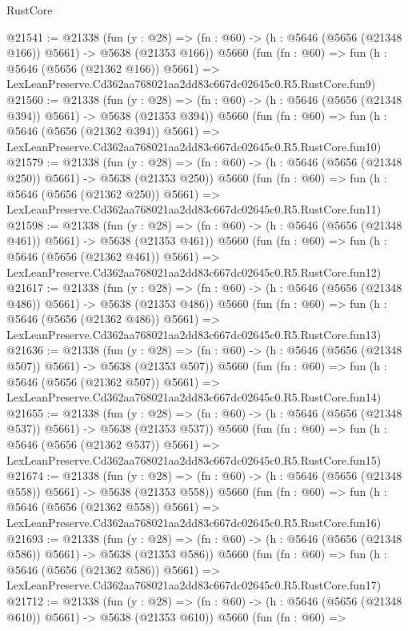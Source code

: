 \begin{lexlean}{RustCore}
\begin{coremodule}
@21541 := @21338
    (fun (y : @28) => (fn : @60) -> (h : @5646 (@5656 (@21348 @166)) @5661) -> @5638 (@21353 @166))
    @5660
    (fun (fn : @60) =>
    fun (h : @5646 (@5656 (@21362 @166)) @5661) =>
    LexLeanPreserve.Cd362aa768021aa2dd83c667dc02645c0.R5.RustCore.fun9)
@21560 := @21338
    (fun (y : @28) => (fn : @60) -> (h : @5646 (@5656 (@21348 @394)) @5661) -> @5638 (@21353 @394))
    @5660
    (fun (fn : @60) =>
    fun (h : @5646 (@5656 (@21362 @394)) @5661) =>
    LexLeanPreserve.Cd362aa768021aa2dd83c667dc02645c0.R5.RustCore.fun10)
@21579 := @21338
    (fun (y : @28) => (fn : @60) -> (h : @5646 (@5656 (@21348 @250)) @5661) -> @5638 (@21353 @250))
    @5660
    (fun (fn : @60) =>
    fun (h : @5646 (@5656 (@21362 @250)) @5661) =>
    LexLeanPreserve.Cd362aa768021aa2dd83c667dc02645c0.R5.RustCore.fun11)
@21598 := @21338
    (fun (y : @28) => (fn : @60) -> (h : @5646 (@5656 (@21348 @461)) @5661) -> @5638 (@21353 @461))
    @5660
    (fun (fn : @60) =>
    fun (h : @5646 (@5656 (@21362 @461)) @5661) =>
    LexLeanPreserve.Cd362aa768021aa2dd83c667dc02645c0.R5.RustCore.fun12)
@21617 := @21338
    (fun (y : @28) => (fn : @60) -> (h : @5646 (@5656 (@21348 @486)) @5661) -> @5638 (@21353 @486))
    @5660
    (fun (fn : @60) =>
    fun (h : @5646 (@5656 (@21362 @486)) @5661) =>
    LexLeanPreserve.Cd362aa768021aa2dd83c667dc02645c0.R5.RustCore.fun13)
@21636 := @21338
    (fun (y : @28) => (fn : @60) -> (h : @5646 (@5656 (@21348 @507)) @5661) -> @5638 (@21353 @507))
    @5660
    (fun (fn : @60) =>
    fun (h : @5646 (@5656 (@21362 @507)) @5661) =>
    LexLeanPreserve.Cd362aa768021aa2dd83c667dc02645c0.R5.RustCore.fun14)
@21655 := @21338
    (fun (y : @28) => (fn : @60) -> (h : @5646 (@5656 (@21348 @537)) @5661) -> @5638 (@21353 @537))
    @5660
    (fun (fn : @60) =>
    fun (h : @5646 (@5656 (@21362 @537)) @5661) =>
    LexLeanPreserve.Cd362aa768021aa2dd83c667dc02645c0.R5.RustCore.fun15)
@21674 := @21338
    (fun (y : @28) => (fn : @60) -> (h : @5646 (@5656 (@21348 @558)) @5661) -> @5638 (@21353 @558))
    @5660
    (fun (fn : @60) =>
    fun (h : @5646 (@5656 (@21362 @558)) @5661) =>
    LexLeanPreserve.Cd362aa768021aa2dd83c667dc02645c0.R5.RustCore.fun16)
@21693 := @21338
    (fun (y : @28) => (fn : @60) -> (h : @5646 (@5656 (@21348 @586)) @5661) -> @5638 (@21353 @586))
    @5660
    (fun (fn : @60) =>
    fun (h : @5646 (@5656 (@21362 @586)) @5661) =>
    LexLeanPreserve.Cd362aa768021aa2dd83c667dc02645c0.R5.RustCore.fun17)
@21712 := @21338
    (fun (y : @28) => (fn : @60) -> (h : @5646 (@5656 (@21348 @610)) @5661) -> @5638 (@21353 @610))
    @5660
    (fun (fn : @60) =>

\end{coremodule}
\end{lexlean}
